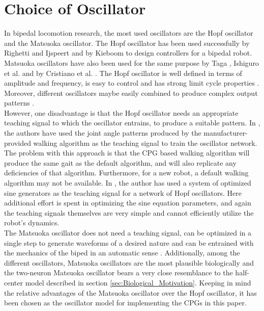 \documentclass[12pt,twoside]{article}
\theoremstyle{plain}
\theoremstyle{definition}
\theoremstyle{remark}
\newcommand{\forceindent}{\leavevmode{\parindent=2em\indent}}
\begin{document}
\section{Choice of Oscillator}
\label{sec:Choice_of_Oscillator}
In bipedal locomotion research, the most used oscillators are the Hopf oscillator and the Matsuoka oscillator. The Hopf oscillator has been used successfully by Righetti and Ijspeert \cite{Righetti2006} and by Kieboom \cite{Kieboom2009} to design controllers for a bipedal robot. Matsuoka oscillators have also been used for the same purpose by Taga \cite{Taga1991}, Ishiguro et al. \cite{Ishiguro2003} and by Cristiano et al. \cite{cristiano2014locomotion}. The Hopf oscillator is well defined in terms of amplitude and frequency, is easy to control and has strong limit cycle properties \cite{Kieboom2009}. Moreover, different oscillators maybe easily combined to produce complex output patterns \cite{Righetti2006}. \\
\forceindent However, one disadvantage is that the Hopf oscillator needs an appropriate teaching signal to which the oscillator entrains, to produce a suitable pattern. In \cite{Righetti2006}, the authors have used the joint angle patterns produced by the manufacturer-provided walking algorithm as the teaching signal to train the oscillator network. The problem with this approach is that the CPG based walking algorithm will produce the same gait as the default algorithm, and will also replicate any deficiencies of that algorithm. Furthermore, for a new robot, a default walking algorithm may not be  available. In \cite{Kieboom2009}, the author has used a system of optimized sine generators as the teaching signal for a network of Hopf oscillators. Here additional effort is spent in optimizing the sine equation parameters, and again the teaching signals themselves are very simple and cannot efficiently utilize the robot's dynamics.\\
\forceindent The Matsuoka oscillator does not need a teaching signal, can be optimized in a single step to generate waveforms of a desired nature and can be entrained with the mechanics of the biped in an automatic sense \cite{Kieboom2009}. Additionally, among the different oscillators, Matsuoka oscillators are the most plausible biologically and the two-neuron Matsuoka oscillator \cite{Matsuoka1987} bears a very close resemblance to the half-center model described in section \ref{sec:Biological_Motivation}. Keeping in mind the relative advantages of the Matsuoka oscillator over the Hopf oscillator, it has been chosen as the oscillator model for implementing the CPGs in this paper.
\end{document}
